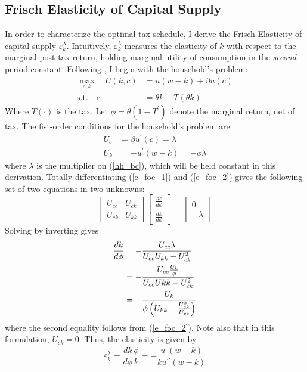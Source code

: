 \documentclass[11pt]{article}
\newcommand{\p}{\prime}
\begin{document}
\subsection{Frisch Elasticity of Capital Supply}
In order to characterize the optimal tax schedule, I derive the Frisch Elasticity of capital supply \( \varepsilon_k^\lambda \). Intuitively, \( \varepsilon_k^\lambda \) measures the elasticity of \( k \) with respect to the marginal post-tax return, holding marginal utility of consumption in the \textit{second} period constant. Following \cite{paradisi_notes}, I begin with the household's problem:
\begin{align}
    \max_{c,k}\quad U(k, c) &= u(w - k) + \beta u(c) \\
    \text{s.t.}\quad c &= \theta k - T(\theta k) \label{hh_bc}
\end{align}
Where \( T(\cdot) \) is the tax. Let \( \phi = \theta(1 - T^\p) \) denote the marginal return, net of tax. The fist-order conditions for the household's problem are 
\begin{align}
    U_c &= \beta u^\p(c) = \lambda \label{e_foc_1} \\
    U_k &= -u^\p(w - k) = -\phi \lambda \label{e_foc_2}
\end{align}
where \( \lambda \) is the multiplier on (\ref{hh_bc}), which will be held constant in this derivation. Totally differentiating (\ref{e_foc_1}) and (\ref{e_foc_2}) gives the following set of two equations in two unknowns:
\begin{equation}
    \begin{bmatrix}
        U_{cc} & U_{ck} \\
        U_{ck} & U_{kk}
    \end{bmatrix} \begin{bmatrix}
        \frac{dc}{d\phi} \\ \frac{dk}{d\phi} 
    \end{bmatrix} = \begin{bmatrix}
        0 \\ -\lambda
    \end{bmatrix}
\end{equation}
Solving by inverting gives 
\begin{align}
    \frac{dk}{d\phi} &= -\frac{U_{cc}\lambda}{U_{cc}U_{kk} - U_{ck}^2} \notag \\
    &= -\frac{U_{cc}\frac{U_k}{\phi}}{U_{cc}U{kk} - U_{ck}^2} \\
    &= -\frac{U_k}{\phi\left( U_{kk} - \frac{U_{ck}^2}{U_{cc}} \right)}
\end{align}
where the second equality follows from (\ref{e_foc_2}). Note also that in this formulation, \( U_{ck} = 0 \). Thus, the elasticity is given by 
\begin{equation}
    \varepsilon_k^\lambda = \frac{dk}{d\phi} \frac{\phi}{k} = -\frac{u^\p(w - k)}{ku^{\p\p}(w - k)} \label{frisch}
\end{equation}
\end{document}
